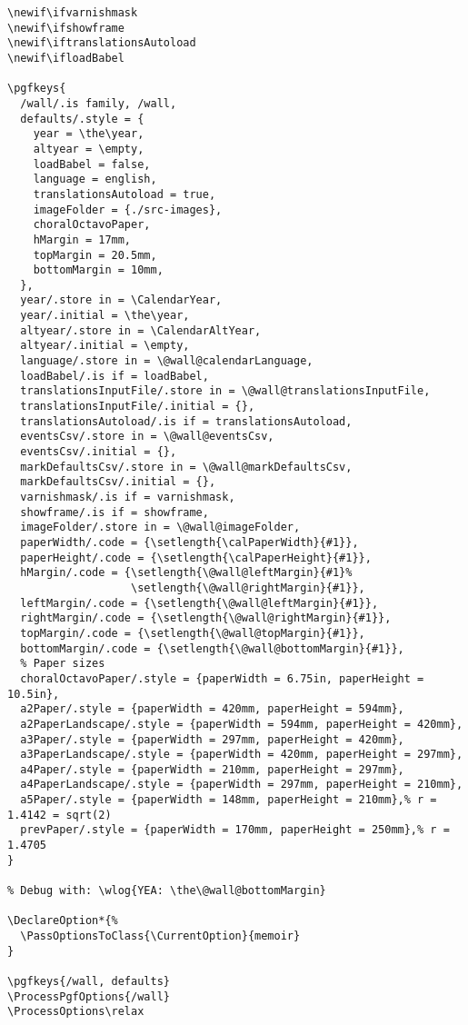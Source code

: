\documentclass[11pt,oneside]{memoir-article}
\begin{document}
\begin{verbatim}
\newif\ifvarnishmask
\newif\ifshowframe
\newif\iftranslationsAutoload
\newif\ifloadBabel

\pgfkeys{
  /wall/.is family, /wall,
  defaults/.style = {
    year = \the\year,
    altyear = \empty,
    loadBabel = false,
    language = english,
    translationsAutoload = true,
    imageFolder = {./src-images},
    choralOctavoPaper,
    hMargin = 17mm,
    topMargin = 20.5mm,
    bottomMargin = 10mm,
  },
  year/.store in = \CalendarYear,
  year/.initial = \the\year,
  altyear/.store in = \CalendarAltYear,
  altyear/.initial = \empty,
  language/.store in = \@wall@calendarLanguage,
  loadBabel/.is if = loadBabel,
  translationsInputFile/.store in = \@wall@translationsInputFile,
  translationsInputFile/.initial = {},
  translationsAutoload/.is if = translationsAutoload,
  eventsCsv/.store in = \@wall@eventsCsv,
  eventsCsv/.initial = {},
  markDefaultsCsv/.store in = \@wall@markDefaultsCsv,
  markDefaultsCsv/.initial = {},
  varnishmask/.is if = varnishmask,
  showframe/.is if = showframe,
  imageFolder/.store in = \@wall@imageFolder,
  paperWidth/.code = {\setlength{\calPaperWidth}{#1}},
  paperHeight/.code = {\setlength{\calPaperHeight}{#1}},
  hMargin/.code = {\setlength{\@wall@leftMargin}{#1}%
                   \setlength{\@wall@rightMargin}{#1}},
  leftMargin/.code = {\setlength{\@wall@leftMargin}{#1}},
  rightMargin/.code = {\setlength{\@wall@rightMargin}{#1}},
  topMargin/.code = {\setlength{\@wall@topMargin}{#1}},
  bottomMargin/.code = {\setlength{\@wall@bottomMargin}{#1}},
  % Paper sizes
  choralOctavoPaper/.style = {paperWidth = 6.75in, paperHeight = 10.5in},
  a2Paper/.style = {paperWidth = 420mm, paperHeight = 594mm},
  a2PaperLandscape/.style = {paperWidth = 594mm, paperHeight = 420mm},
  a3Paper/.style = {paperWidth = 297mm, paperHeight = 420mm},
  a3PaperLandscape/.style = {paperWidth = 420mm, paperHeight = 297mm},
  a4Paper/.style = {paperWidth = 210mm, paperHeight = 297mm},
  a4PaperLandscape/.style = {paperWidth = 297mm, paperHeight = 210mm},
  a5Paper/.style = {paperWidth = 148mm, paperHeight = 210mm},% r = 1.4142 = sqrt(2)
  prevPaper/.style = {paperWidth = 170mm, paperHeight = 250mm},% r = 1.4705
}

% Debug with: \wlog{YEA: \the\@wall@bottomMargin}

\DeclareOption*{%
  \PassOptionsToClass{\CurrentOption}{memoir}
}

\pgfkeys{/wall, defaults}
\ProcessPgfOptions{/wall}
\ProcessOptions\relax
\end{verbatim}
\end{document}
